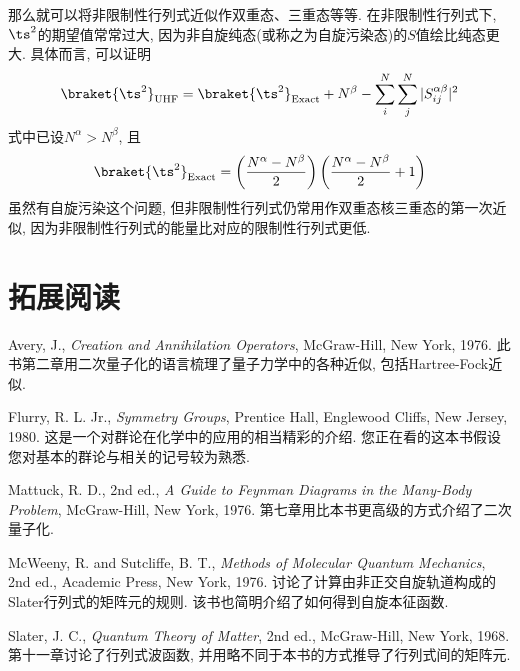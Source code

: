 那么就可以将非限制性行列式近似作双重态、三重态等等. 
在非限制性行列式下, 
$\ts^2$的期望值常常过大, 
因为非自旋纯态(或称之为自旋污染态)的$S$值绘比纯态更大. 
具体而言, 
可以证明
\begin{align}
\braket{\ts^2}_\mathrm{UHF} = \braket{\ts^2}_\mathrm{Exact} + N^\beta - \sum_i^N\sum_j^N|S_{ij}^{\alpha\beta}|^2
\end{align}
式中已设$N^\alpha > N^\beta$, 
且
\begin{align}
	\braket{\ts^2}_\mathrm{Exact} = \left( \frac{N^\alpha - N^\beta}{2} \right) \left( \frac{N^\alpha - N^\beta}{2} + 1\right)
\end{align}
虽然有自旋污染这个问题, 
但非限制性行列式仍常用作双重态核三重态的第一次近似, 
因为非限制性行列式的能量比对应的限制性行列式更低.


\theendnotes
{}
\section*{拓展阅读}

\indent Avery, J., \textit{Creation and Annihilation Operators}, McGraw-Hill, New York, 1976. 
此书第二章用二次量子化的语言梳理了量子力学中的各种近似, 包括Hartree-Fock近似.

Flurry, R. L. Jr., \textit{Symmetry Groups}, Prentice Hall, Englewood Cliffs, New Jersey, 1980. 
这是一个对群论在化学中的应用的相当精彩的介绍. 您正在看的这本书假设您对基本的群论与相关的记号较为熟悉.

Mattuck, R. D., 2nd ed., \textit{A Guide to Feynman Diagrams in the Many-Body Problem}, McGraw-Hill, New York, 1976. 
第七章用比本书更高级的方式介绍了二次量子化.

McWeeny, R. and Sutcliffe, B. T., \textit{Methods of Molecular Quantum Mechanics}, 2nd ed., Academic Press, New York, 1976. 
讨论了计算由非正交自旋轨道构成的Slater行列式的矩阵元的规则. 该书也简明介绍了如何得到自旋本征函数.

Slater, J. C., \textit{Quantum Theory of Matter}, 2nd ed., McGraw-Hill, New York, 1968. 
第十一章讨论了行列式波函数, 并用略不同于本书的方式推导了行列式间的矩阵元.
